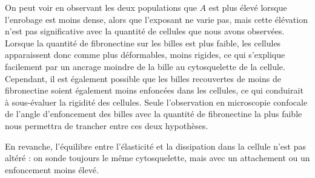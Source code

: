 \documentclass{report}
\begin{document}
On peut voir en observant les deux populations que $A$ est plus élevé lorsque l'enrobage est moins dense, alors que l'exposant ne varie pas, mais cette élévation n'est pas significative avec la quantité de cellules que nous avons observées.
Lorsque la quantité de fibronectine sur les billes est plus faible, les cellules apparaissent donc comme plus déformables, moins rigides, ce qui s'explique facilement par un ancrage moindre de la bille au cytosquelette de la cellule.  Cependant, il est également possible que les billes recouvertes de moins de fibronectine soient également moins enfoncées dans les cellules, ce qui conduirait à sous-évaluer la rigidité des cellules. Seule l'observation en microscopie confocale de l'angle d'enfoncement des billes avec la quantité de fibronectine la plus faible nous permettra de trancher entre ces deux hypothèses. 

En revanche, l'équilibre entre l'élasticité et la dissipation dans la cellule n'est pas altéré : on sonde toujours le même cytosquelette, mais avec un attachement ou un enfoncement moins élevé. 
\end{document}
